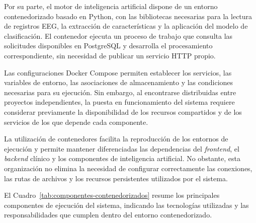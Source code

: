 Por su parte, el motor de inteligencia artificial
dispone de un entorno contenedorizado basado en
Python, con las bibliotecas necesarias para
la lectura de registros EEG, la extracción de
características y la aplicación del modelo de
clasificación. El contenedor ejecuta un proceso de trabajo que
consulta las solicitudes disponibles en PostgreSQL
y desarrolla el procesamiento correspondiente,
sin necesidad de publicar un servicio HTTP propio.

Las configuraciones Docker Compose permiten
establecer los servicios, las variables de entorno,
las asociaciones de almacenamiento y las condiciones
necesarias para su ejecución. Sin embargo, al
encontrarse distribuidas entre proyectos independientes,
la puesta en funcionamiento del sistema requiere
considerar previamente la disponibilidad de los
recursos compartidos y de los servicios de los
que depende cada componente.

La utilización de contenedores facilita la
reproducción de los entornos de ejecución y
permite mantener diferenciadas las dependencias
del \textit{frontend}, el \textit{backend} clínico y los componentes
de inteligencia artificial. No obstante, esta
organización no elimina la necesidad de configurar
correctamente las conexiones, las rutas de archivos
y los recursos persistentes utilizados por el sistema.


El Cuadro~\ref{tab:componentes-contenedorizados} resume los
principales componentes de ejecución del sistema, indicando
las tecnologías utilizadas y las responsabilidades que
cumplen dentro del entorno contenedorizado.

